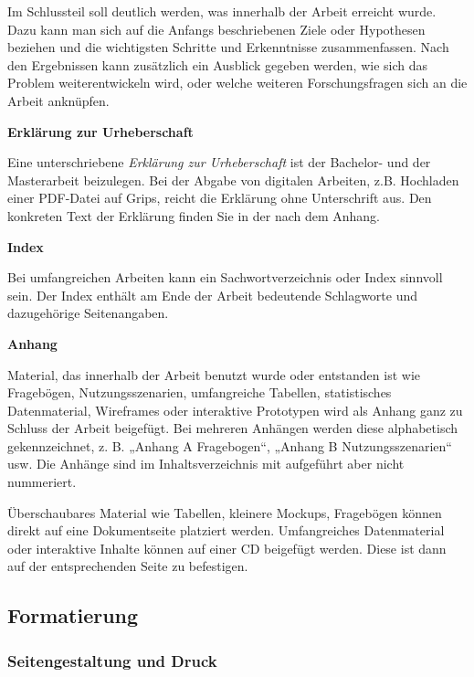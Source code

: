 Im Schlussteil soll deutlich werden, was innerhalb der Arbeit erreicht wurde. Dazu kann man sich auf die Anfangs beschriebenen Ziele oder Hypothesen beziehen und die wichtigsten Schritte und Erkenntnisse zusammenfassen. Nach den Ergebnissen kann zusätzlich ein Ausblick gegeben werden, wie sich das Problem weiterentwickeln wird, oder welche weiteren Forschungsfragen sich an die Arbeit anknüpfen.

\bigskip
\textbf{Erklärung zur Urheberschaft}

Eine unterschriebene \textit{Erklärung zur Urheberschaft} ist der Bachelor- und der Masterarbeit beizulegen. Bei der Abgabe von digitalen Arbeiten, z.B. Hochladen einer PDF-Datei auf Grips, reicht die Erklärung ohne Unterschrift aus. Den konkreten Text der Erklärung finden Sie in der nach dem Anhang. 

\bigskip
\textbf{Index}

Bei umfangreichen Arbeiten kann ein Sachwortverzeichnis oder Index sinnvoll sein. Der Index enthält am Ende der Arbeit bedeutende Schlagworte und dazugehörige Seitenangaben.

\bigskip
\textbf{Anhang}

Material, das innerhalb der Arbeit benutzt wurde oder entstanden ist wie Fragebögen, Nutzungsszenarien, umfangreiche Tabellen, statistisches Datenmaterial, Wireframes oder interaktive Prototypen wird als Anhang ganz zu Schluss der Arbeit beigefügt. Bei mehreren Anhängen werden diese alphabetisch gekennzeichnet, z. B. „Anhang A Fragebogen“, „Anhang B Nutzungsszenarien“ usw. Die Anhänge sind im Inhaltsverzeichnis mit aufgeführt aber nicht nummeriert.

Überschaubares Material wie Tabellen, kleinere Mockups, Fragebögen können direkt auf eine Dokumentseite platziert werden. Umfangreiches Datenmaterial oder interaktive Inhalte können auf einer CD beigefügt werden. Diese ist dann auf der entsprechenden Seite zu befestigen. 

\subsection{Formatierung}\label{subsec:formatierung}

\subsubsection{Seitengestaltung und Druck}\label{subsubsec:seitengestaltung}

